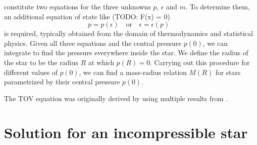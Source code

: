  constitute two equations for the three unknowns $p$, $\epsilon$ and $m$.
To determine them, an additional equation of state like
(TODO: F(x) = 0)
\begin{equation}
	p = p(\epsilon)
	\quad \text{or} \quad
	\epsilon = \epsilon(p)
\end{equation}
is required, typically obtained from the domain of thermodynamics and statistical physics.
Given all three equations and the central pressure $p(0)$, we can integrate to find the pressure everywhere inside the star.
We define the radius of the star to be the radius $R$ at which $p(R) = 0$.
Carrying out this procedure for different values of $p(0)$, we can find a mass-radius relation $M(R)$ for stars parametrized by their central pressure $p(0)$.

The TOV equation was originally derived by \cite{ref:tov} using multiple results from \cite{ref:tolman}.

\section{Solution for an incompressible star}
\label{sec:incompressible_star}



